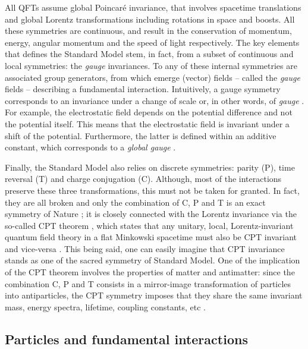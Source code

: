All QFTs assume global Poincaré invariance, that involves spacetime translations and global Lorentz transformations including rotations in space and boosts. All these symmetries are continuous, and result in the conservation of momentum, energy, angular momentum and the speed of light respectively. The key elements that defines the Standard Model stem, in fact, from a subset of continuous and local symmetries: the \textit{gauge} invariances. To any of these internal symmetries are associated group generators, from which emerge (vector) fields -- called the \textit{gauge} fields --
describing a fundamental interaction. Intuitively, a gauge symmetry corresponds to an invariance under a change of scale or, in other words, of \textit{gauge} \cite{DefinitionGAUGE2023}. For example, the electrostatic field depends on the potential difference and not the potential itself. This means that the electrostatic field is invariant under a shift of the potential. Furthermore, the latter is defined within an additive constant, which corresponds to a \textit{global gauge} \cite{braibantParticlesFundamentalInteractions2012}.

Finally, the Standard Model also relies on discrete symmetries: parity (P), time reversal (T) and charge conjugation (C). Although, most of the interactions preserve these three transformations, this must not be taken for granted. In fact, they are all broken and only the combination of C, P and T is an exact symmetry of Nature \cite{sozziTestsDiscreteSymmetries2019}; it is closely connected with the Lorentz invariance via the so-called CPT theorem \cite{lehnertCPTSymmetryIts2016}, which states that any unitary, local, Lorentz-invariant quantum field theory in a flat Minkowski spacetime must also be CPT invariant and vice-versa \cite{lehnertCPTSymmetryIts2016}\cite{sachsPhysicsTimeReversal1987}. This being said, one can easily imagine that CPT invariance stands as one of the sacred symmetry of Standard Model. One of the implication of the CPT theorem involves the properties of matter and antimatter: since the combination C, P and T consists in a mirror-image transformation of particles into antiparticles, the CPT symmetry imposes that they share the same invariant mass, energy spectra, lifetime, coupling constants, etc  \cite{lehnertCPTSymmetryIts2016}\cite{schotterMultidifferentialInvestigationStrangeness2023}.

\subsection{Particles and fundamental interactions}
\label{subsec:ParticleAndInteractions}


